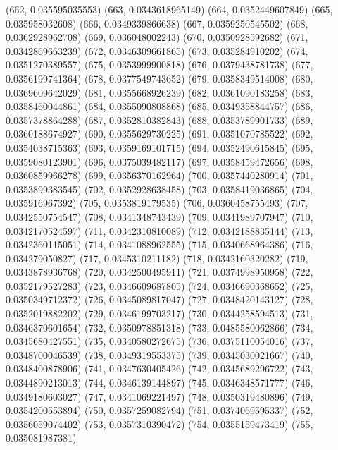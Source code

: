 {					(662, 0.035595035553)
					(663, 0.0343618965149)
					(664, 0.0352449607849)
					(665, 0.035958032608)
					(666, 0.0349339866638)
					(667, 0.0359250545502)
					(668, 0.0362928962708)
					(669, 0.036048002243)
					(670, 0.0350928592682)
					(671, 0.0342869663239)
					(672, 0.0346309661865)
					(673, 0.035284910202)
					(674, 0.0351270389557)
					(675, 0.0353999900818)
					(676, 0.0379438781738)
					(677, 0.0356199741364)
					(678, 0.0377549743652)
					(679, 0.0358349514008)
					(680, 0.0369609642029)
					(681, 0.0355668926239)
					(682, 0.0361090183258)
					(683, 0.0358460044861)
					(684, 0.0355090808868)
					(685, 0.0349358844757)
					(686, 0.0357378864288)
					(687, 0.0352810382843)
					(688, 0.0353789901733)
					(689, 0.0360188674927)
					(690, 0.0355629730225)
					(691, 0.0351070785522)
					(692, 0.0354038715363)
					(693, 0.0359169101715)
					(694, 0.0352490615845)
					(695, 0.0359080123901)
					(696, 0.0375039482117)
					(697, 0.0358459472656)
					(698, 0.0360859966278)
					(699, 0.0356370162964)
					(700, 0.0357440280914)
					(701, 0.0353899383545)
					(702, 0.0352928638458)
					(703, 0.0358419036865)
					(704, 0.035916967392)
					(705, 0.0353819179535)
					(706, 0.0360458755493)
					(707, 0.0342550754547)
					(708, 0.0341348743439)
					(709, 0.0341989707947)
					(710, 0.0342170524597)
					(711, 0.0342310810089)
					(712, 0.0342188835144)
					(713, 0.0342360115051)
					(714, 0.0341088962555)
					(715, 0.0340668964386)
					(716, 0.034279050827)
					(717, 0.0345310211182)
					(718, 0.0342160320282)
					(719, 0.0343878936768)
					(720, 0.0342500495911)
					(721, 0.0374998950958)
					(722, 0.0352179527283)
					(723, 0.0346609687805)
					(724, 0.0346690368652)
					(725, 0.0350349712372)
					(726, 0.0345089817047)
					(727, 0.0348420143127)
					(728, 0.0352019882202)
					(729, 0.0346199703217)
					(730, 0.0344258594513)
					(731, 0.0346370601654)
					(732, 0.0350978851318)
					(733, 0.0485580062866)
					(734, 0.0345680427551)
					(735, 0.0340580272675)
					(736, 0.0375110054016)
					(737, 0.0348700046539)
					(738, 0.0349319553375)
					(739, 0.0345030021667)
					(740, 0.0348400878906)
					(741, 0.0347630405426)
					(742, 0.0345689296722)
					(743, 0.0344890213013)
					(744, 0.0346139144897)
					(745, 0.0346348571777)
					(746, 0.0349180603027)
					(747, 0.0341069221497)
					(748, 0.0350319480896)
					(749, 0.0354200553894)
					(750, 0.0357259082794)
					(751, 0.0374069595337)
					(752, 0.0356059074402)
					(753, 0.0357310390472)
					(754, 0.0355159473419)
					(755, 0.035081987381)
}
